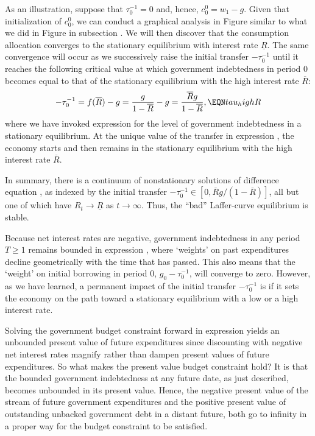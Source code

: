 As an illustration, suppose that $\tau^{-1}_0=0$ and,
hence, $c^0_0 = w_1 -g$. Given that initialization 
of $c^0_0$, we can conduct a graphical analysis
in Figure  similar to what we did
in Figure  
in subsection . We will then
discover that the consumption allocation converges 
to the stationary equilibrium with interest rate 
$\underline R$. The same convergence will occur as we
successively raise the initial transfer $- \tau^{-1}_0$
until it reaches the following critical value at which 
government indebtedness in period $0$ becomes equal 
to that of the stationary equilibrium with the high 
interest rate $\overline R$:
$$ - \tau^{-1}_0 =  f(\overline R) - g 
           =  {g \over 1-\overline R} -g
           = {\overline R g \over 1- \overline R},    \EQN tau_highR
$$
where we have invoked expression 
for the level of government indebtedness in
a stationary equilibrium. At the unique value of the
transfer in expression , the economy
starts and then remains in the stationary
equilibrium with the high interest rate $\overline R$. 


In summary, there is a continuum of nonstationary solutions
of  difference equation , as indexed by the
initial transfer 
$- \tau^{-1}_0 \in [0, \overline R g /(1- \overline R)]$, 
all but one of which  have
$R_t \rightarrow \underline R$ as $t \rightarrow \infty$.  
Thus, the ``bad'' Laffer-curve equilibrium is stable.

Because net interest rates are negative, government indebtedness
in any period $T\geq 1$ remains bounded in expression , 
where `weights' on past expenditures decline 
geometrically with the time that has passed. This also means 
that the `weight' on initial borrowing in period $0$, 
$g_0-\tau^{-1}_0$, will converge to zero. However,
as we have learned, a permanent impact of the initial 
transfer $-\tau^{-1}_0$ is if
it sets the economy on the path toward a stationary
equilibrium with a low or a high interest rate.

Solving the government budget constraint
forward in expression  yields an
unbounded present value of future expenditures 
since discounting with negative net interest rates magnify 
rather than dampen present values of future expenditures.
So what makes the present value budget constraint hold? 
It is that the bounded government indebtedness at any future
date, as just described, becomes unbounded in
its present value. Hence, the negative present value
of the stream of future government expenditures
and the positive present value of outstanding unbacked 
government debt in a distant future, both go to infinity 
in a proper way for the budget constraint to be satisfied.



